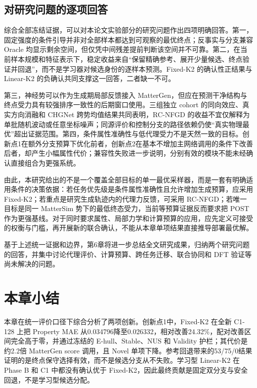 \subsection{对研究问题的逐项回答}

综合全部冻结证据，可以对本论文实验部分的研究问题作出四项明确回答。第一，固定强度的条件引导并非对全部样本都达到可观察的最优终点；反事实与分支兼容 Oracle 均显示剩余空间，但仅凭中间残差提前判断该空间并不可靠。第二，在当前样本规模和特征表示下，稳定收益来自``保留精确参考、展开少量候选、终点验证并回退''，而不是学习器对候选身份的逐样本预测。Fixed-K2 的确认性正结果与 Linear-K2 的负确认共同支撑这一回答，二者缺一不可。

第三，神经势可以作为生成期局部反馈接入 MatterGen，但应在预测干净结构与终点受力具有较强排序一致性的后期窗口使用。三组独立 cohort 的同向效应、真实方向消融和 CHGNet 跨势均值结果共同表明，RC-NFGD 的收益不宜仅解释为单批随机波动或任意坐标噪声；同源评价和控制分支的路径依赖仍使``真实物理最优''超出证据范围。第四，条件属性准确性与低代理受力不是天然一致的目标。创新点1在额外分支预算下优化前者，创新点2在基本不增加主网络调用的条件下改善后者，却产生小幅属性代价；兼容性失败进一步说明，分别有效的模块不能未经确认直接组合为更强系统。

由此，本研究给出的不是一个覆盖全部目标的单一最优采样器，而是一套有明确适用条件的决策依据：若任务优先级是条件属性准确性且允许增加生成预算，应采用 Fixed-K2；若重点是研究生成轨迹内的代理力反馈，可采用 RC-NFGD；若唯一目标是同一 Matter\allowbreak Sim 势下的最低终态受力，当前等预算证据反而要求把 POST 作为更强基线。对于同时要求属性、局部力学和计算预算的应用，应先定义可接受的权衡与门槛，再开展新的联合确认，不能从本章单项结果直接推导部署最优解。

基于上述统一证据和边界，第6章将进一步总结全文研究成果，归纳两个研究问题的回答，并集中讨论代理评价、计算预算、跨任务迁移、联合协同和 DFT 验证等尚未解决的问题。

\section{本章小结}

本章在统一评价口径下综合分析了两项创新。创新点1中，Fixed-K2 在全新 C1-128 上把 Property MAE 从0.034796降至0.026332，相对改善24.32\%，配对改善区间完全高于零，并通过冻结的 E-hull、Stable、NUS 和 Validity 护栏；其代价是约2.2倍 MatterGen score 调用，且 Novel 单项下降。参考回退带来的53/75/0结果证明的是终点保守选择有效，而不是候选分支从不失败。学习型 Linear-K2 在 Phase B 和 C1 中都没有确认优于 Fixed-K2，因此最终贡献是固定双分支与安全回退，不是学习型候选分配。

